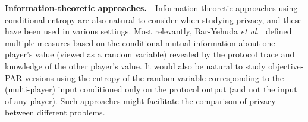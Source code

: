 \documentclass{article}
\theoremstyle{theorem}
\theoremstyle{definition}
\theoremstyle{remark}
\newcommand{\etal}{\emph{et al}}
\begin{document}
\textbf{Information-theoretic approaches.}\ \ Information-the\-oretic approaches using conditional entropy are also natural to consider when studying privacy, and these have been used in various settings.  Most relevantly, Bar-Yehuda \etal.~\cite{BCKO} defined multiple measures based on the conditional mutual information about one player's value (viewed as a random variable) revealed by the protocol trace and knowledge of the other player's value.  It would also be natural to study objective-PAR versions using the entropy of the random variable corresponding to the (multi-player) input conditioned only on the protocol output (and not the input of any player).  Such approaches might facilitate the comparison of privacy between different problems.
\end{document}
